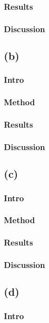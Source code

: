 \documentclass[11pt,a4paper,notitlepage]{article}
\begin{document}
\subsubsection{Results}
\subsubsection{Discussion}

\subsection{(b)}
\subsubsection{Intro}
\subsubsection{Method}
\subsubsection{Results}
\subsubsection{Discussion}

\subsection{(c)}
\subsubsection{Intro}
\subsubsection{Method}
\subsubsection{Results}
\subsubsection{Discussion}

\subsection{(d)}
\subsubsection{Intro}
\end{document}
